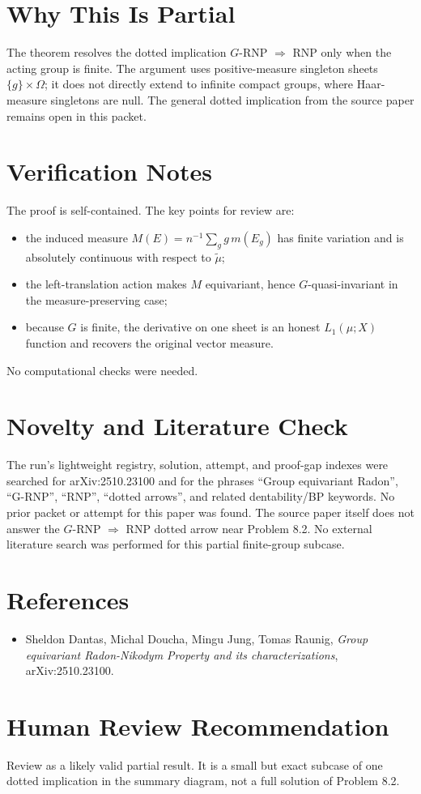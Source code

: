 \documentclass[11pt]{article}
\begin{document}
\section*{Why This Is Partial}

The theorem resolves the dotted implication $G$-RNP $\Rightarrow$ RNP only
when the acting group is finite. The argument uses positive-measure singleton
sheets $\{g\}\times\Omega$; it does not directly extend to infinite compact
groups, where Haar-measure singletons are null. The general dotted implication
from the source paper remains open in this packet.

\section*{Verification Notes}

The proof is self-contained. The key points for review are:
\begin{itemize}
\item the induced measure $M(E)=n^{-1}\sum_g g\,m(E_g)$ has finite variation
  and is absolutely continuous with respect to $\widetilde\mu$;
\item the left-translation action makes $M$ equivariant, hence
  $G$-quasi-invariant in the measure-preserving case;
\item because $G$ is finite, the derivative on one sheet is an honest
  $L_1(\mu;X)$ function and recovers the original vector measure.
\end{itemize}

No computational checks were needed.

\section*{Novelty and Literature Check}

The run's lightweight registry, solution, attempt, and proof-gap indexes were
searched for arXiv:2510.23100 and for the phrases ``Group equivariant
Radon'', ``G-RNP'', ``RNP'', ``dotted arrows'', and related dentability/BP
keywords. No prior packet or attempt for this paper was found. The source
paper itself does not answer the $G$-RNP $\Rightarrow$ RNP dotted arrow near
Problem 8.2. No external literature search was performed for this partial
finite-group subcase.

\section*{References}

\begin{itemize}
\item Sheldon Dantas, Michal Doucha, Mingu Jung, Tomas Raunig,
  \emph{Group equivariant Radon-Nikodym Property and its characterizations},
  arXiv:2510.23100.
\end{itemize}

\section*{Human Review Recommendation}

Review as a likely valid partial result. It is a small but exact subcase of
one dotted implication in the summary diagram, not a full solution of
Problem 8.2.
\end{document}
